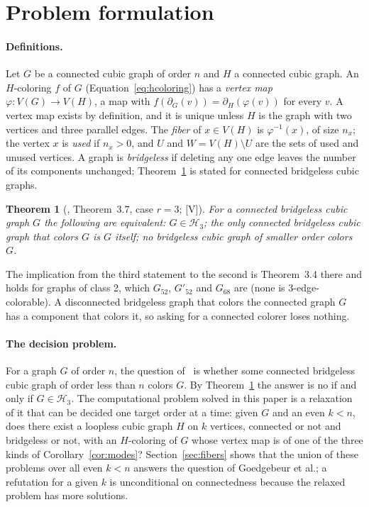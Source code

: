 \documentclass[11pt]{article}
\newtheorem{theorem}{Theorem}[section]
\theoremstyle{definition}
\theoremstyle{remark}
\newcommand{\Hthree}{\mathcal{H}_3}
\newcommand{\Ga}{G_{52}}
\newcommand{\Gb}{G'_{52}}
\newcommand{\Gsix}{G_{68}}
\newcommand{\evV}{\textnormal{[V]}}
\begin{document}
\section{Problem formulation}\label{sec:problem}

\paragraph{Definitions.} Let $G$ be a connected cubic graph of order $n$ and $H$ a connected cubic graph.
An $H$-coloring $f$ of $G$ (Equation~\eqref{eq:hcoloring}) has a \emph{vertex map} $\varphi : V(G) \to V(H)$,
a map with $f(\partial_G(v)) = \partial_H(\varphi(v))$ for every $v$. A vertex map exists by definition, and it is
unique unless $H$ is the graph with two vertices and three parallel edges. The \emph{fiber} of $x \in V(H)$
is $\varphi^{-1}(x)$, of size $n_x$; the vertex $x$ is \emph{used} if $n_x > 0$, and $U$ and $W = V(H) \setminus U$
are the sets of used and unused vertices. A graph is \emph{bridgeless} if deleting any one edge leaves the number of its components unchanged;
Theorem~\ref{thm:mmsw} is stated for connected bridgeless cubic graphs.

\begin{theorem}[\cite{MMSW2025}, Theorem~3.7, case $r = 3$; \evV]\label{thm:mmsw}
For a connected bridgeless cubic graph $G$ the following are equivalent: $G \in \Hthree$; the only
connected bridgeless cubic graph that colors $G$ is $G$ itself; no bridgeless cubic graph of
smaller order colors $G$.
\end{theorem}

The implication from the third statement to the second is Theorem~3.4 there and holds for graphs of class 2, which $\Ga$, $\Gb$ and $\Gsix$ are (none is 3-edge-colorable). A disconnected bridgeless graph that colors the connected graph $G$ has a component that colors it, so asking for a connected colorer loses nothing.

\paragraph{The decision problem.} For a graph $G$ of order $n$, the question of~\cite[Section~5.4]{GJMMMU2026} is
whether some connected bridgeless cubic graph of order less than $n$ colors $G$. By Theorem~\ref{thm:mmsw} the answer is no
if and only if $G \in \Hthree$. The computational problem solved in this paper is a relaxation of it that
can be decided one target order at a time: given $G$ and an even $k < n$, does there exist a loopless cubic graph $H$
on $k$ vertices, connected or not and bridgeless or not, with an $H$-coloring of $G$ whose vertex map is of one of the
three kinds of Corollary~\ref{cor:modes}? Section~\ref{sec:fibers} shows that the union of these problems over all even
$k < n$ answers the question of Goedgebeur et al.; a refutation for a given $k$ is unconditional on connectedness
because the relaxed problem has more solutions.
\end{document}
